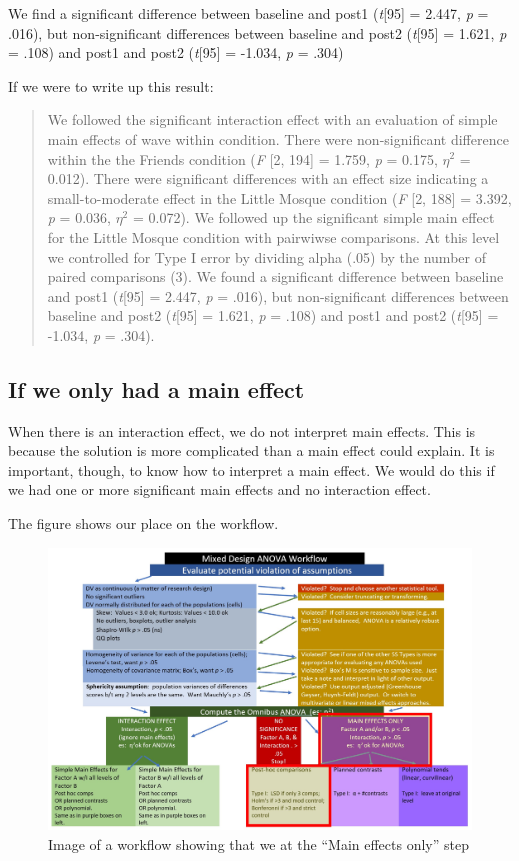 \documentclass[
  11pt,
]{book}
\begin{document}
We find a significant difference between baseline and post1 (\emph{t}{[}95{]} = 2.447, \emph{p} = .016), but non-significant differences between baseline and post2 (\emph{t}{[}95{]} = 1.621, \emph{p} = .108) and post1 and post2 (\emph{t}{[}95{]} = -1.034, \emph{p} = .304)

If we were to write up this result:

\begin{quote}
We followed the significant interaction effect with an evaluation of simple main effects of wave within condition. There were non-significant difference within the the Friends condition (\emph{F} {[}2, 194{]} = 1.759, \emph{p} = 0.175, \(\eta^{2}\) = 0.012). There were significant differences with an effect size indicating a small-to-moderate effect in the Little Mosque condition (\emph{F} {[}2, 188{]} = 3.392, \emph{p} = 0.036, \(\eta^{2}\) = 0.072). We followed up the significant simple main effect for the Little Mosque condition with pairwiwse comparisons. At this level we controlled for Type I error by dividing alpha (.05) by the number of paired comparisons (3). We found a significant difference between baseline and post1 (\emph{t}{[}95{]} = 2.447, \emph{p} = .016), but non-significant differences between baseline and post2 (\emph{t}{[}95{]} = 1.621, \emph{p} = .108) and post1 and post2 (\emph{t}{[}95{]} = -1.034, \emph{p} = .304).
\end{quote}

\hypertarget{if-we-only-had-a-main-effect}{%
\subsection{If we only had a main effect}\label{if-we-only-had-a-main-effect}}

When there is an interaction effect, we do not interpret main effects. This is because the solution is more complicated than a main effect could explain. It is important, though, to know how to interpret a main effect. We would do this if we had one or more significant main effects and no interaction effect.

The figure shows our place on the workflow.

\begin{figure}
\centering
\includegraphics{images/mixed/mx_main.jpg}
\caption{Image of a workflow showing that we at the ``Main effects only'' step}
\end{figure}
\end{document}
